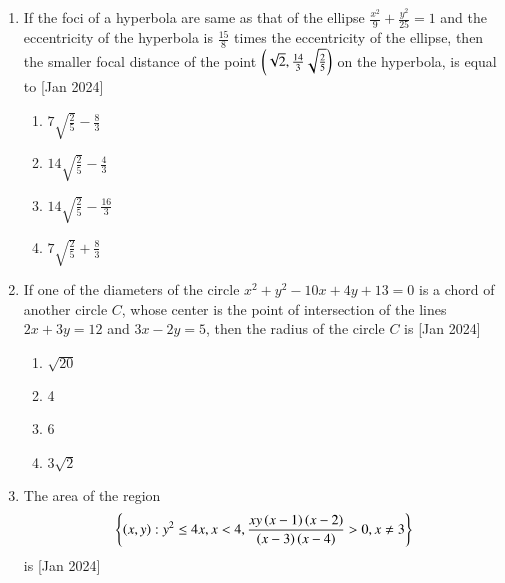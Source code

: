 \documentclass[journal]{IEEEtran}
\begin{document}
\begin{enumerate}
    \item If the foci of a hyperbola are same as that of the ellipse
    $\frac{x^2}{9} + \frac{y^2}{25} = 1$ and the eccentricity of the
    hyperbola is $\frac{15}{8}$ times the eccentricity of the
    ellipse, then the smaller focal distance of the point
    $\left(\sqrt{2}, \frac{14}{3} \sqrt{\frac{2}{5}}\right)$ on the hyperbola,
    is equal to
    \hfill{[Jan 2024]}

    \begin{multicols}{4}
\begin{enumerate}

        \item $7\sqrt{\frac{2}{5}} - \frac{8}{3}$
        \item $14\sqrt{\frac{2}{5}} - \frac{4}{3}$
        \item $14\sqrt{\frac{2}{5}} - \frac{16}{3}$
        \item $7\sqrt{\frac{2}{5}} + \frac{8}{3}$
    \end{enumerate}
\end{multicols}

    \item If one of the diameters of the circle $x^2 + y^2 - 10x +
    4y + 13 = 0$ is a chord of another circle $C$, whose
    center is the point of intersection of the lines $2x +
    3y = 12$ and $3x - 2y = 5$, then the radius of the
    circle $C$ is
    \hfill{[Jan 2024]}
    
    \begin{multicols}{4}
\begin{enumerate}

        \item $\sqrt{20}$
        \item 4
        \item 6
        \item $3\sqrt{2}$
    \end{enumerate}
\end{multicols}

    \item The area of the region
        \begin{align*}
            \left\{\left(x,y\right): y^2\le 4x,x<4,\frac{xy\left(x-1\right)\left(x-2\right)}{\left(x-3\right)\left(x-4\right)}>0,x\ne3\right\}
        \end{align*}
    is
    \hfill{[Jan 2024]}

    \begin{multicols}{4}
\begin{enumerate}


\end{enumerate}
\end{multicols}
\end{enumerate}
\end{document}
